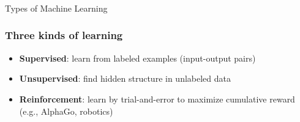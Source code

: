 %





\begin{frame}[fragile]\frametitle{}
\begin{center}
{\Large Types of Machine Learning}
\end{center}
\end{frame}


\begin{frame}[fragile]\frametitle{Three kinds of learning}
\begin{itemize}
\item \textbf{Supervised}: learn from labeled examples (input-output pairs)
\item \textbf{Unsupervised}: find hidden structure in unlabeled data
\item \textbf{Reinforcement}: learn by trial-and-error to maximize cumulative reward (e.g., AlphaGo, robotics)
\end{itemize}
\end{frame}


